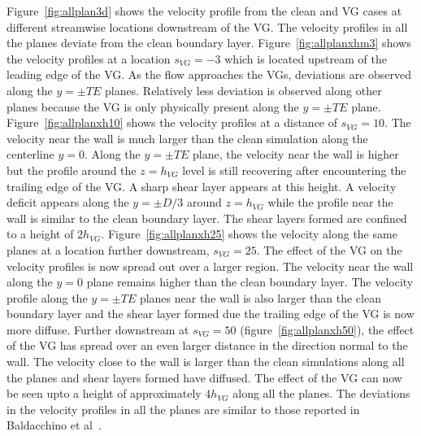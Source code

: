 Figure~\ref{fig:allplan3d} shows the velocity profile from the clean and VG cases at different streamwise locations downstream of the VG. The velocity profiles in all the planes deviate from the clean boundary layer. 
Figure~\ref{fig:allplanxhm3} shows the velocity profiles at a location $s_{VG}=-3$ which is located upstream of the leading edge of the VG. As the flow approaches the VGs, deviations are observed along the $y=\pm TE$ planes. Relatively less deviation is observed along other planes because the VG is only physically present along the $y=\pm TE$ plane. 
Figure~\ref{fig:allplanxh10} shows the velocity profiles at a distance of $s_{VG}=10$. The velocity near the wall is much larger than the clean simulation along the centerline $y=0$. Along the $y=\pm TE$ plane, the velocity near the wall is higher but the profile around the $z=h_{VG}$ level is still recovering after encountering the trailing edge of the VG. A sharp shear layer appears at this height. A velocity deficit appears along the $y=\pm D/3$ around $z=h_{VG}$ while the profile near the wall is similar to the clean boundary layer. The shear layers formed are confined to a height of $2h_{VG}$.
Figure~\ref{fig:allplanxh25} shows the velocity along the same planes at a location further downstream, $s_{VG}=25$. The effect of the VG on the velocity profiles is now spread out over a larger region. The velocity near the wall along the $y=0$ plane remains higher than the clean boundary layer.  The velocity profile along the $y=\pm TE$ planes near the wall is also larger than the clean boundary layer and the shear layer formed due the trailing edge of the VG is now more diffuse. 
Further downstream at $s_{VG} = 50$ (figure~\ref{fig:allplanxh50}), the effect of the VG has spread over an even larger distance in the direction normal to the wall. The velocity close to the wall is larger than the clean simulations along all the planes and shear layers formed have diffused. The effect of the VG can now be seen upto a height of approximately $4h_{VG}$ along all the planes. The deviations in the velocity profiles in all the planes are similar to those reported in Baldacchino et al~\cite{Baldacchino_VG}.
